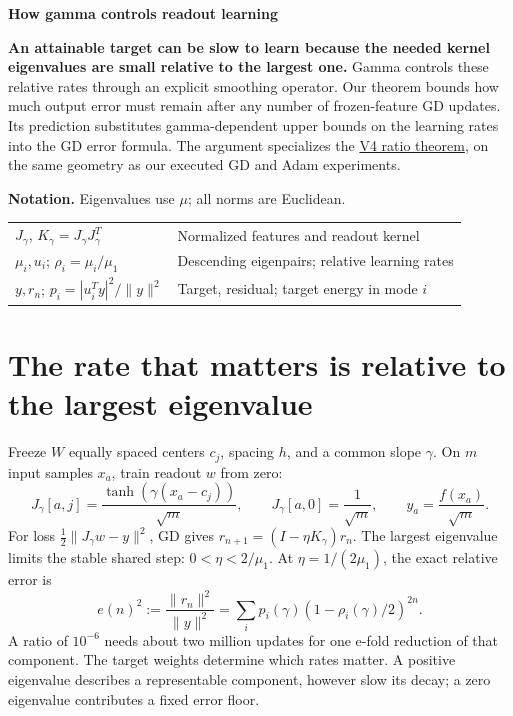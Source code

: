 \documentclass[11pt]{article}
\begin{document}
\thispagestyle{plain}
{\fontsize{20}{23}\selectfont\bfseries How gamma controls readout learning\par}
\vspace{5pt}
\textbf{An attainable target can be slow to learn because the needed kernel
eigenvalues are small relative to the largest one.} Gamma controls these
relative rates through an explicit smoothing operator. Our theorem bounds how
much output error must remain after any number of frozen-feature GD updates.
Its prediction substitutes gamma-dependent upper bounds on the learning rates
into the GD error formula. The argument specializes the
\href{gamma_ratio_note_v4.pdf}{V4 ratio theorem}, on the same geometry as
our executed GD and Adam experiments.

\textbf{Notation.} Eigenvalues use $\mu$; all norms are Euclidean.
\begin{center}\small
\begin{tabularx}{\linewidth}{@{}p{.37\linewidth}X@{}}
\hline
$J_\gamma$, $K_\gamma=J_\gamma J_\gamma^T$ & Normalized features and readout kernel\\
$\mu_i,u_i$; $\rho_i=\mu_i/\mu_1$ & Descending eigenpairs; relative learning rates\\
$y,r_n$; $p_i=|u_i^Ty|^2/\|y\|^2$ & Target, residual; target energy in mode $i$\\\hline
\end{tabularx}\end{center}
\section{The rate that matters is relative to the largest eigenvalue}
Freeze $W$ equally spaced centers $c_j$, spacing $h$, and a common slope
$\gamma$. On $m$ input samples $x_a$, train readout $w$ from zero:
\[
J_\gamma[a,j]=\frac{\tanh(\gamma(x_a-c_j))}{\sqrt m},\qquad
J_\gamma[a,0]=\frac1{\sqrt m},\qquad y_a=\frac{f(x_a)}{\sqrt m}.
\]
For loss $\frac12\|J_\gamma w-y\|^2$, GD gives
$r_{n+1}=(I-\eta K_\gamma)r_n$. The largest eigenvalue limits the stable
shared step: $0<\eta<2/\mu_1$. At $\eta=1/(2\mu_1)$, the exact relative error is
\[
e(n)^2:=\frac{\|r_n\|^2}{\|y\|^2}
=\sum_i p_i(\gamma)(1-\rho_i(\gamma)/2)^{2n}.
\]
A ratio of $10^{-6}$ needs about two million updates for one e-fold reduction
of that component. The target weights determine which rates matter. A positive
eigenvalue describes a representable component, however slow its decay;
a zero eigenvalue contributes a fixed error floor.
\end{document}
